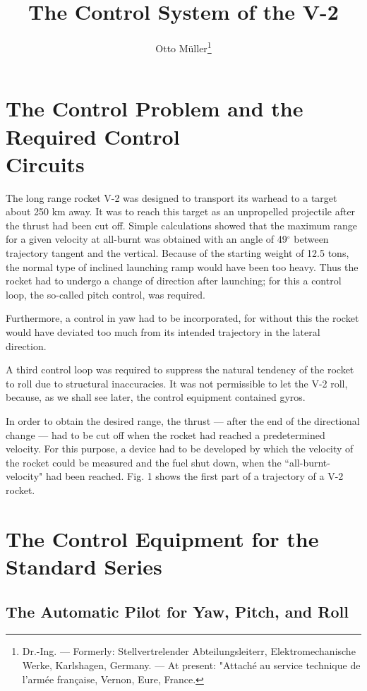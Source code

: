 \documentclass[12pt, a4paper]{article}
\title{The Control System of the V-2}
\author{Otto Müller\footnote{Dr.-Ing. — Formerly: Stellvertrelender Abteilungsleiterr, Elektromechanische Werke, Karlshagen, Germany. — At present: "Attaché au service technique de l'armée française, Vernon, Eure, France.}}
\date{}
\begin{document}
\maketitle
\tableofcontents

\newpage
\section[The Control Problem and the Required Control Circuits]{The Control Problem and the Required Control\\Circuits}

The long range rocket V-2 was designed to transport its warhead to a target about 250 km away. It was to reach this target as an unpropelled projectile after the thrust had been cut off. Simple calculations showed that the maximum range for a given velocity at all-burnt was obtained with an angle of 49$^\circ$ between trajectory tangent and the vertical. Because of the starting weight of 12.5 tons, the normal type of inclined launching ramp would have been too heavy. Thus the rocket had to undergo a change of direction after launching; for this a control loop, the so-called pitch control, was required.

Furthermore, a control in yaw had to be incorporated, for without this the rocket would have deviated too much from its intended trajectory in the lateral direction.

A third control loop was required to suppress the natural tendency of the rocket to roll due to structural inaccuracies. It was not permissible to let the V-2 roll, because, as we shall see later, the control equipment contained gyros.

In order to obtain the desired range, the thrust — after the end of the directional change — had to be cut off when the rocket had reached a predetermined velocity. For this purpose, a device had to be developed by which the velocity of the rocket could be measured and the fuel shut down, when the ``all-burnt-velocity" had been reached. Fig. 1 shows the first part of a trajectory of a V-2 rocket.

\section{The Control Equipment for the Standard Series}

\subsection{The Automatic Pilot for Yaw, Pitch, and Roll}
\end{document}
